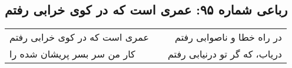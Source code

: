 \begin{center}
\section*{رباعی شماره ۹۵: عمری است که در کوی خرابی رفتم}
\label{sec:095}
\begin{longtable}{l p{0.5cm} r}
عمری است که در کوی خرابی رفتم
&&
در راه خطا و ناصوابی رفتم
\\
کار من سر بسر پریشان شده را
&&
دریاب، که گر تو درنیابی رفتم
\\
\end{longtable}
\end{center}
